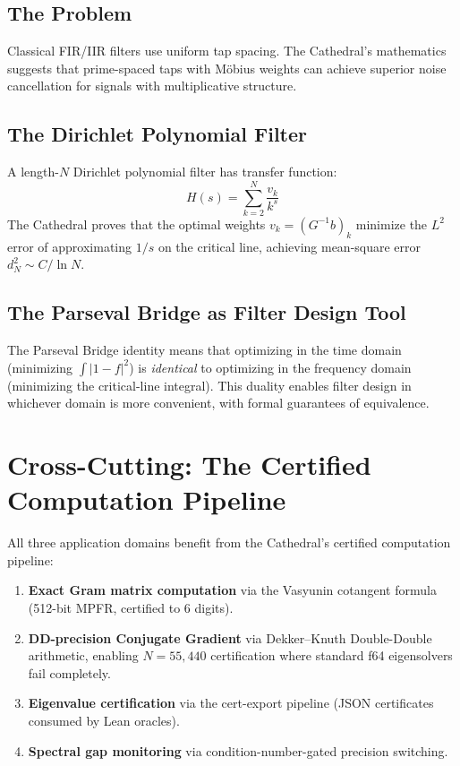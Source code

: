 \documentclass[11pt,a4paper]{article}
\begin{document}
\subsection{The Problem}

Classical FIR/IIR filters use uniform tap spacing. The Cathedral's
mathematics suggests that prime-spaced taps with M\"obius weights
can achieve superior noise cancellation for signals with
multiplicative structure.

\subsection{The Dirichlet Polynomial Filter}

A length-$N$ Dirichlet polynomial filter has transfer function:
\[
  H(s) = \sum_{k=2}^{N} \frac{v_k}{k^s}
\]
The Cathedral proves that the optimal weights $v_k = (G^{-1}b)_k$
minimize the $L^2$ error of approximating $1/s$ on the critical
line, achieving mean-square error $d_N^2 \sim C/\ln N$.

\subsection{The Parseval Bridge as Filter Design Tool}

The Parseval Bridge identity means that optimizing in the time
domain (minimizing $\int|1-f|^2$) is \emph{identical} to optimizing
in the frequency domain (minimizing the critical-line integral).
This duality enables filter design in whichever domain is more
convenient, with formal guarantees of equivalence.

\section{Cross-Cutting: The Certified Computation Pipeline}

All three application domains benefit from the Cathedral's certified
computation pipeline:

\begin{enumerate}
  \item \textbf{Exact Gram matrix computation} via the Vasyunin
    cotangent formula (512-bit MPFR, certified to 6 digits).
  \item \textbf{DD-precision Conjugate Gradient} via Dekker--Knuth
    Double-Double arithmetic, enabling $N = 55{,}440$ certification
    where standard f64 eigensolvers fail completely.
  \item \textbf{Eigenvalue certification} via the cert-export
    pipeline (JSON certificates consumed by Lean oracles).
  \item \textbf{Spectral gap monitoring} via condition-number-gated
    precision switching.
\end{enumerate}
\end{document}
